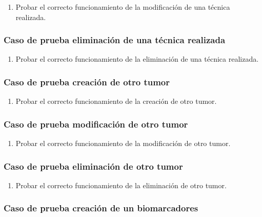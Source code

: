 \begin{enumerate}
    \item Probar el correcto funcionamiento de la modificación de una técnica realizada.
\end{enumerate}

\subsubsection{Caso de prueba eliminación de una técnica realizada}

\begin{enumerate}
    \item Probar el correcto funcionamiento de la eliminación de una técnica realizada.
\end{enumerate}

\subsubsection{Caso de prueba creación de otro tumor}

\begin{enumerate}
    \item Probar el correcto funcionamiento de la creación de otro tumor.
\end{enumerate}

\subsubsection{Caso de prueba modificación de otro tumor}

\begin{enumerate}
    \item Probar el correcto funcionamiento de la modificación de otro tumor.
\end{enumerate}

\subsubsection{Caso de prueba eliminación de otro tumor}

\begin{enumerate}
    \item Probar el correcto funcionamiento de la eliminación de otro tumor.
\end{enumerate}

\subsubsection{Caso de prueba creación de un biomarcadores}

